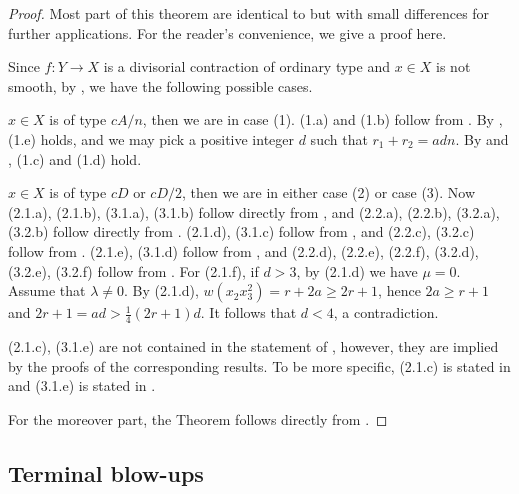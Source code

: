 \documentclass[11pt]{amsart}
\numberwithin{equation}{section}
\theoremstyle{definition}
\theoremstyle{definition}
\begin{document}
\begin{proof}
Most part of this theorem are identical to \cite[Theorem 1.2]{Kaw05} but with small differences for further applications. For the reader's convenience, we give a proof here.

Since $f: Y\to X$ is a divisorial contraction of ordinary type and $x\in X$ is not smooth, by \cite[Theorem 1.2]{Kaw05}, we have the following possible cases.

\medskip

$x\in X$ is of type $cA/n$, then we are in case (1). (1.a) and (1.b) follow from \cite[Theorem 1.2(i)]{Kaw05}. By \cite[Theorem 1.2(i.a)]{Kaw05}, (1.e) holds, and we may pick a positive integer $d$ such that $r_1+r_2=adn$. By \cite[Theorem 1.2(i.c)]{Kaw05} and \cite[Theorem 1.2(i.d)]{Kaw05}, (1.c) and (1.d) hold.

\medskip

$x\in X$ is of type $cD$ or $cD/2$, then we are in either case (2) or case (3). Now (2.1.a), (2.1.b), (3.1.a), (3.1.b) follow directly from \cite[Theorems 1.2(ii.a) and 1.2(ii.a.1)]{Kaw05}, and (2.2.a), (2.2.b), (3.2.a), (3.2.b) follow directly from \cite[Theorem~1.2(ii.b)]{Kaw05}. (2.1.d), (3.1.c) follow from \cite[Theorems 1.2(ii.a.1) and 1.2(ii.a.2)]{Kaw05}, and (2.2.c), (3.2.c) follow from \cite[Theorem~1.3(ii.b.1)]{Kaw05}. (2.1.e), (3.1.d) follow from \cite[Theorem~1.2(ii.a.2)]{Kaw05}, and (2.2.d), (2.2.e), (2.2.f), (3.2.d), (3.2.e), (3.2.f) follow from \cite[Theorem~1.2(ii.b.2)]{Kaw05}. For (2.1.f), if $d>3$, by (2.1.d) we have $\mu=0$. Assume that $\lambda\neq 0$. By (2.1.d), $w(x_2x_3^2)=r+2a\geq 2r+1$, hence $2a\geq r+1$ and $2r+1=ad>\frac{1}{4}(2r+1)d$. It follows that $d<4$, a contradiction.

\medskip

(2.1.c), (3.1.e) are not contained in the statement of \cite[Theorem~1.2]{Kaw05}, however, they are implied by the proofs of the corresponding results. To be more specific, (2.1.c) is stated in \cite[\S 4, Case Ic]{Che15} and (3.1.e) is stated in \cite[Page 13, Line 10]{CH11}.

\medskip

For the moreover part, the Theorem follows directly from \cite[Theorem 1.3]{Kaw05}.
\end{proof}



\subsection{Terminal blow-ups}
\end{document}

